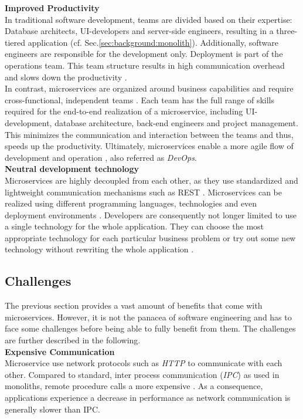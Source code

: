 \noindent
\textbf{Improved Productivity} \\
In traditional software development, teams are divided based on their expertise: Database architects, UI-developers and server-side engineers, resulting in a three-tiered application (cf. Sec.\ref{sec:background:monolith}). Additionally, software engineers are responsible for the development only. Deployment is part of the operations team. This team structure results in high communication overhead and slows down the productivity \cite{Mazlami}. \\
In contrast, microservices are organized around business capabilities and require cross-functional, independent teams \cite{ObjectAwareAmiri}. Each team has the full range of skills required for the end-to-end realization of a microservice, including UI-development, database architecture, back-end engineers and project management. 
This minimizes the communication and interaction between the teams and thus, speeds up the productivity. Ultimately, microservices enable a more agile flow of development and operation \cite{ClassificationOfRefactoring}, also referred as \textit{DevOps}. 
\\


\noindent
\textbf{Neutral development technology} \\
Microservices are highly decoupled from each other, as they use standardized and lightweight communication mechanisms such as REST \cite{FunctionalDecompositionHeinrich}. Microservices can be realized using different programming languages, technologies and even deployment environments \cite{DataflowDrivenChen}. Developers are consequently not longer limited to use a single technology for the whole application. They can choose the most appropriate technology for each particular business problem or try out some new technology without rewriting the whole application \cite{ServiceCutter} \cite{TowardsTechnique}. 




\subsection{Challenges}
The previous section provides a vast amount of benefits that come with microservices. However, it is not the panacea of software engineering and has to face some challenges before being able to fully benefit from them. The challenges are further described in the following. \\

\noindent
\textbf{Expensive Communication}\\
Microservice use network protocols such as \textit{HTTP} to communicate with each other. Compared to standard, inter process communication (\textit{IPC}) as used in monoliths, remote procedure calls a more expensive \cite{SystematicMappingStudyMicroservice}. As a consequence, applications experience a decrease in performance as network communication is generally slower than IPC.\\

